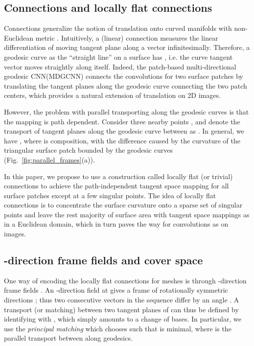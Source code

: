 \documentclass[10pt,twocolumn,letterpaper]{article}
\begin{document}
\subsection{Connections and locally flat connections}
Connections generalize the notion of translation onto curved manifolds with non-Euclidean metric \cite{Lee1997}.
Intuitively, a (linear) connection  measures the linear differentiation of moving tangent plane  along a vector  infinitesimally.
Therefore, a geodesic curve  as the ``straight line'' on a surface has , i.e. the curve tangent vector moves straightly along itself.
Indeed, the patch-based multi-directional geodesic CNN(MDGCNN) \cite{Poulenard:2018:Multidirectional} connects the convolutions for two surface patches by translating the tangent planes along the geodesic curve connecting the two patch centers, which provides a natural extension of translation on 2D images.

However, the problem with parallel transporting along the geodesic curves is that the mapping is path dependent.
Consider three nearby points , and denote the transport of tangent planes along the geodesic curve between  as .
In general, we have , where  is composition, with the difference caused by the curvature of the triangular surface patch bounded by the geodesic curves (Fig.~\ref{fig:parallel_frames}(a)).


In this paper, we propose to use a construction called locally flat (or trivial) connections \cite{Crane:TrivialConnection,Ray:GeometryAware} to achieve the path-independent tangent space mapping for all surface patches except at a few singular points.
The idea of locally flat connections is to concentrate the surface curvature onto a sparse set of singular points and leave the rest majority of surface area with tangent space mappings as in a Euclidean domain, which in turn paves the way for convolutions as on images.

\subsection{-direction frame fields and cover space}
\label{sec:frame_field}
One way of encoding the locally flat connections for meshes is through -direction frame fields \cite{Ray:GeometryAware,DirFieldEG2016}.
An -direction field at  gives a frame of  rotationally symmetric directions ; thus two consecutive vectors in the sequence differ by an angle .
A transport (or matching)  between two tangent planes of  can thus be defined by identifying  with , which simply amounts to a change of bases.
In particular, we use the \textit{principal matching} which chooses  such that  is minimal, where  is the parallel transport between  along geodesics.
\end{document}
